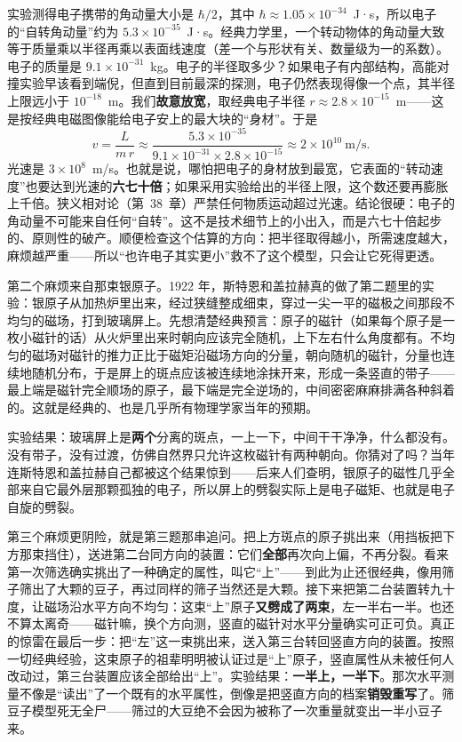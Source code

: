 实验测得电子携带的角动量大小是 $\hbar/2$，其中 $\hbar\approx1.05\times10^{-34}$~J·s，所以电子的“自转角动量”约为 $5.3\times10^{-35}$~J·s。经典力学里，一个转动物体的角动量大致等于质量乘以半径再乘以表面线速度（差一个与形状有关、数量级为一的系数）。电子的质量是 $9.1\times10^{-31}$~kg。电子的半径取多少？如果电子有内部结构，高能对撞实验早该看到端倪，但直到目前最深的探测，电子仍然表现得像一个点，其半径上限远小于 $10^{-18}$~m。我们\textbf{故意放宽}，取经典电子半径 $r\approx2.8\times10^{-15}$~m——这是按经典电磁图像能给电子安上的最大块的“身材”。于是
\[
v=\frac{L}{m\,r}\approx\frac{5.3\times10^{-35}}{9.1\times10^{-31}\times2.8\times10^{-15}}
\approx2\times10^{10}\ \text{m/s}.
\]
光速是 $3\times10^{8}$~m/s。也就是说，哪怕把电子的身材放到最宽，它表面的“转动速度”也要达到光速的\textbf{六七十倍}；如果采用实验给出的半径上限，这个数还要再膨胀上千倍。狭义相对论（第~38~章）严禁任何物质运动超过光速。结论很硬：电子的角动量不可能来自任何“自转”。这不是技术细节上的小出入，而是六七十倍起步的、原则性的破产。顺便检查这个估算的方向：把半径取得越小，所需速度越大，麻烦越严重——所以“也许电子其实更小”救不了这个模型，只会让它死得更透。

第二个麻烦来自那束银原子。1922 年，斯特恩和盖拉赫真的做了第二题里的实验：银原子从加热炉里出来，经过狭缝整成细束，穿过一尖一平的磁极之间那段不均匀的磁场，打到玻璃屏上。先想清楚经典预言：原子的磁针（如果每个原子是一枚小磁针的话）从火炉里出来时朝向应该完全随机，上下左右什么角度都有。不均匀的磁场对磁针的推力正比于磁矩沿磁场方向的分量，朝向随机的磁针，分量也连续地随机分布，于是屏上的斑点应该被连续地涂抹开来，形成一条竖直的带子——最上端是磁针完全顺场的原子，最下端是完全逆场的，中间密密麻麻排满各种斜着的。这就是经典的、也是几乎所有物理学家当年的预期。

实验结果：玻璃屏上是\textbf{两个}分离的斑点，一上一下，中间干干净净，什么都没有。没有带子，没有过渡，仿佛自然界只允许这枚磁针有两种朝向。你猜对了吗？当年连斯特恩和盖拉赫自己都被这个结果惊到——后来人们查明，银原子的磁性几乎全部来自它最外层那颗孤独的电子，所以屏上的劈裂实际上是电子磁矩、也就是电子自旋的劈裂。

第三个麻烦更阴险，就是第三题那串追问。把上方斑点的原子挑出来（用挡板把下方那束挡住），送进第二台同方向的装置：它们\textbf{全部}再次向上偏，不再分裂。看来第一次筛选确实挑出了一种确定的属性，叫它“上”——到此为止还很经典，像用筛子筛出了大颗的豆子，再过同样的筛子当然还是大颗。接下来把第二台装置转九十度，让磁场沿水平方向不均匀：这束“上”原子\textbf{又劈成了两束}，左一半右一半。也还不算太离奇——磁针嘛，换个方向测，竖直的磁针对水平分量确实可正可负。真正的惊雷在最后一步：把“左”这一束挑出来，送入第三台转回竖直方向的装置。按照一切经典经验，这束原子的祖辈明明被认证过是“上”原子，竖直属性从未被任何人改动过，第三台装置应该全部给出“上”。实验结果：\textbf{一半上，一半下}。那次水平测量不像是“读出”了一个既有的水平属性，倒像是把竖直方向的档案\textbf{销毁重写}了。筛豆子模型死无全尸——筛过的大豆绝不会因为被称了一次重量就变出一半小豆子来。

